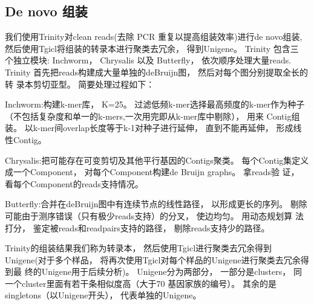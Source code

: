 \documentclass[10pt,oneside,a4paper]{article}	%
\begin{document}
\subsection{De novo 组装}
我们使用Trinity对clean reads(去除 PCR 重复以提高组装效率)进行de novo组装, 然后使用Tgicl将组装的转录本进行聚类去冗余， 得到Unigene。 Trinity 包含三
个独立模块: Inchworm， Chrysalis 以及 Butterfly， 依次顺序处理大量reads. Trinity 首先把reads构建成大量单独的deBruijn图， 然后对每个图分别提取全长的转
录本剪切亚型。 简要处理过程如下：\par
\vspace{5mm}
Inchworm:构建k-mer库， K=25。 过滤低频k-mer选择最高频度的k-mer作为种子（不包括复杂度和单一的k-mers,一次用完即从k-mer库中剔除）， 用来
Contig组装。 以k-mer间overlap长度等于k-1对种子进行延伸， 直到不能再延伸， 形成线性Contig。
\par
\vspace{5mm}
Chrysalis:把可能存在可变剪切及其他平行基因的Contigs聚类。 每个Contig集定义成一个Component， 对每个Component构建de Bruijn graphs。 拿reads验
证， 看每个Component的reads支持情况。
\par
\vspace{5mm}

Butterfly:合并在deBruijn图中有连续节点的线性路径， 以形成更长的序列。 剔除可能由于测序错误（只有极少reads支持）的分叉， 使边均匀。 用动态规划算
法打分， 鉴定被reads和readpairs支持的路径， 剔除reads支持少的路径。
\par
\vspace{5 mm}

Trinity的组装结果我们称为转录本， 然后使用Tgicl进行聚类去冗余得到Unigene(对于多个样品， 将再次使用Tgicl对每个样品的Unigene进行聚类去冗余得到最
终的Unigene用于后续分析)。 Unigene分为两部分， 一部分是clusters， 同一个cluster里面有若干条相似度高（大于70%
基因家族的编号）。 其余的是singletons（以Unigene开头）， 代表单独的Unigene。
\par
\vspace{5 mm}
\end{document}
